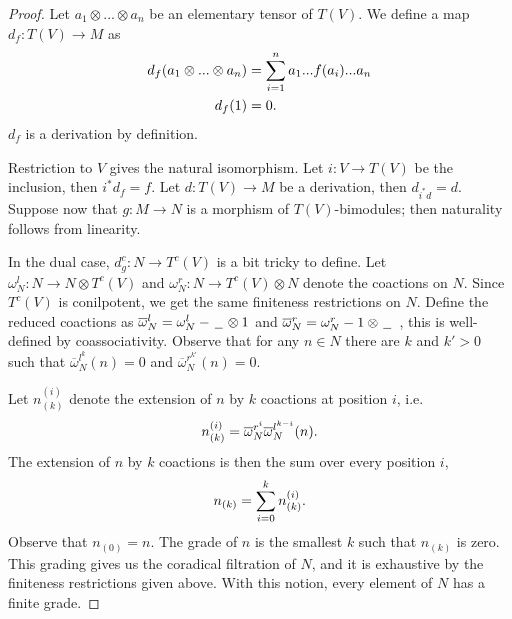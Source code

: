 \documentclass[../thesis.tex]{subfiles}
\begin{document}
            \begin{proof}
                Let $a_1\otimes ... \otimes a_n$ be an elementary tensor of $T(V)$. We define a map $d_f : T(V) \rightarrow M$ as
                \begin{align*}
                    d_f(a_1\otimes ... \otimes a_n) & = \sum_{i=1}^n a_1...f(a_i)...a_n \\
                    d_f(1) & = 0\tt{.} 
                \end{align*}
                $d_f$ is a derivation by definition.
                
                Restriction to $V$ gives the natural isomorphism. Let $i : V\rightarrow T(V)$ be the inclusion, then $i^*d_f = f$. Let $d : T(V) \rightarrow M$ be a derivation, then $d_{i^*d}=d$. Suppose now that $g: M \rightarrow N$ is a morphism of $T(V)$-bimodules; then naturality follows from linearity.

                In the dual case, $d_g^c: N \rightarrow T^c(V)$ is a bit tricky to define. Let $\omega^l_N:N\rightarrow N\otimes T^c(V)$ and $\omega^r_N : N\rightarrow T^c(V) \otimes N$ denote the coactions on $N$. Since $T^c(V)$ is conilpotent, we get the same finiteness restrictions on $N$. Define the reduced coactions as $\overline{\omega}^l_N = \omega^l_N - \argument\otimes 1$ and $\overline{\omega}^r_N = \omega^r_N - 1\otimes\argument\ $, this is well-defined by coassociativity. Observe that for any $n\in N$ there are $k$ and $k'>0$ such that ${\overline{\omega}^{l^k}_N}(n) = 0$ and ${\overline{\omega}^{r^{k'}}_N}(n)=0$.

                Let $n_{(k)}^{(i)}$ denote the extension of $n$ by $k$ coactions at position $i$, i.e. 
                \begin{align*}
                    n_{(k)}^{(i)} = \overline{\omega}^{r^i}_N\overline{\omega}^{l^{k-i}}_N(n)\tt{.} 
                \end{align*}
                The extension of $n$ by $k$ coactions is then the sum over every position $i$,
                \begin{align*}
                    n_{(k)} = \sum_{i=0}^kn_{(k)}^{(i)}\tt{.}
                \end{align*} 
                Observe that $n_{(0)} = n$. The grade of $n$ is the smallest $k$ such that $n_{(k)}$ is zero. This grading gives us the coradical filtration of $N$, and it is exhaustive by the finiteness restrictions given above. With this notion, every element of $N$ has a finite grade.


\end{proof}
\end{document}
